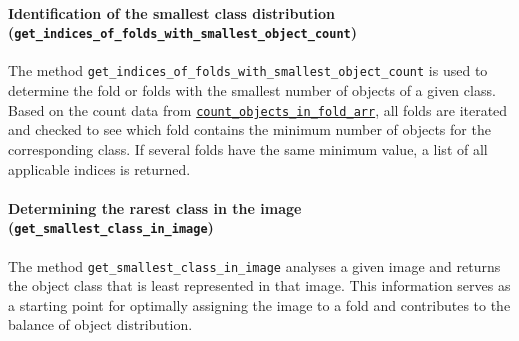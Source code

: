 \paragraph{Identification of the smallest class distribution (\lstinline|get_indices_of_folds_with_smallest_object_count|)}
\hypertarget{par:get_indices_folds_with_smallest_object_count}{}

The method \lstinline|get_indices_of_folds_with_smallest_object_count| is used to determine the fold or folds with the smallest number of objects of a given class. Based on the count data from \hyperlink{par:count_objects_in_fold_arr}{\lstinline|count_objects_in_fold_arr|}, all folds are iterated and checked to see which fold contains the minimum number of objects for the corresponding class. If several folds have the same minimum value, a list of all applicable indices is returned.

\paragraph{Determining the rarest class in the image (\lstinline|get_smallest_class_in_image|)}
\hypertarget{par:get_smallest_class_in_image}{}

The method \lstinline|get_smallest_class_in_image| analyses a given image and returns the object class that is least represented in that image. This information serves as a starting point for optimally assigning the image to a fold and contributes to the balance of object distribution.
